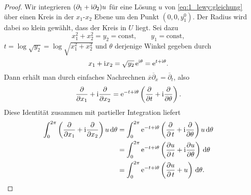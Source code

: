 \begin{proof}
Wir integrieren $(\partial_1+\mathrm i\partial_2) u$ für eine Lösung $u$ von \eqref{eq:1_lewy:gleichung} über einen Kreis in der $x_1$-$x_2$ Ebene um den Punkt $(0,0,y_1^0)$. Der Radius wird dabei so klein gewählt, dass der Kreis in $U$ liegt. Sei dazu
\begin{equation}
x_1^2+x_2^2=y_2=\mathrm{const},\qquad y_1=\mathrm{const},
\end{equation}
$t=\log\sqrt{y_2}=\log\sqrt{x_1^2+x_2^2}$ und $\theta$ derjenige Winkel gegeben durch
\begin{equation}
x_1+\mathrm i x_2=\sqrt{y_2} \, \mathrm e^{\mathrm i\theta} =\mathrm e^{t+\mathrm i\theta}.
\end{equation}
Dann erhält man
durch einfaches Nachrechnen $\overline x \overline\partial_x = \overline\partial_t$, also
\begin{equation}\label{thm:1_lewy:proof1}
\frac{\partial}{\partial x_1} +\mathrm i\frac{\partial}{\partial x_2}=
\mathrm e^{-t+\mathrm i\theta} \left(\frac{\partial}{\partial t}
+\mathrm i\frac{\partial}{\partial \theta}\right).
\end{equation}
Diese Identität zusammen mit partieller Integration liefert
\begin{align}\label{thm:1_lewy:abl_gleich}
\begin{split}
\int_0^{2\pi} \left(\frac{\partial}{\partial x_1} +\mathrm i\frac{\partial}{\partial x_2}\right)u\,\mathrm d\theta 
&= \int_0^{2\pi} \mathrm e^{-t+\mathrm i\theta} \left(\frac{\partial}{\partial \,t}+\mathrm i\frac{\partial}{\partial \theta}\right)u \,\mathrm d\theta \\
&= \int_0^{2\pi} \mathrm e^{-t+\mathrm i\theta} \left(\frac{\partial u}{\partial \,t} +\mathrm i\frac{\partial u}{\partial \theta}\right)\,\mathrm d\theta \\
&= \int_0^{2\pi} \mathrm e^{-t+\mathrm i\theta} \left(\frac{\partial u}{\partial \,t} +u\right)\,\mathrm d\theta .
\end{split}
\end{align}

\end{proof}
